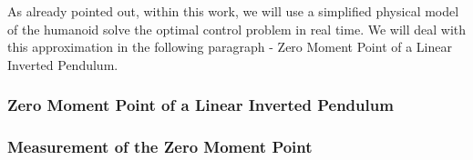 \\\\
As already pointed out, within this work, we will use a simplified physical model of the humanoid solve the optimal control problem in real time. We will deal with this approximation in the following paragraph - Zero Moment Point of a Linear Inverted Pendulum.





 
\subsubsection{Zero Moment Point of a Linear Inverted Pendulum}
\subsubsection{Measurement of the Zero Moment Point}
